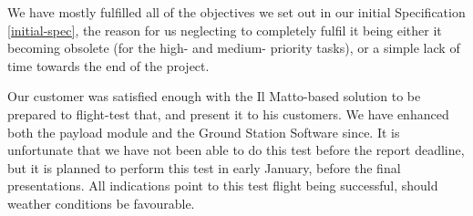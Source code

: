 We have mostly fulfilled all of the objectives we set out in our initial 
Specification \ref{initial-spec}, the reason for us neglecting to completely 
fulfil it being either it becoming obsolete (for the high- and medium- 
priority tasks), or a simple lack of time towards the end of the project.

Our customer was satisfied enough with the Il Matto-based solution to be prepared 
to flight-test that, and present it to his customers. We have enhanced 
both the payload module and the Ground Station Software since. 
It is unfortunate that we have not been able to do this 
test before the report deadline, but it is planned to perform this test in 
early January, before the final presentations. All indications point to this 
test flight being successful, should weather conditions be favourable.
